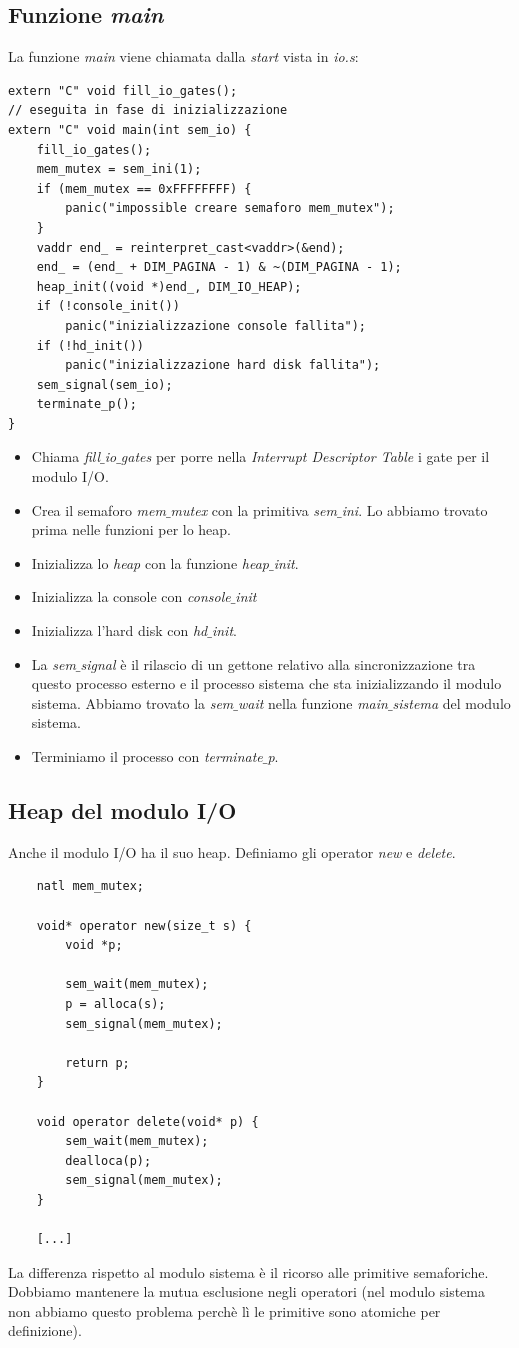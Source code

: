 \documentclass[11pt]{report}
\theoremstyle{definition}
\begin{document}
\subsection{Funzione \emph{main}}
La funzione \emph{main} viene chiamata dalla \emph{start} vista in \emph{io.s}:
\small
\begin{verbatim}
extern "C" void fill_io_gates();
// eseguita in fase di inizializzazione
extern "C" void main(int sem_io) {	
    fill_io_gates();
    mem_mutex = sem_ini(1);
    if (mem_mutex == 0xFFFFFFFF) {
        panic("impossible creare semaforo mem_mutex");
    }
    vaddr end_ = reinterpret_cast<vaddr>(&end);
    end_ = (end_ + DIM_PAGINA - 1) & ~(DIM_PAGINA - 1);
    heap_init((void *)end_, DIM_IO_HEAP);
    if (!console_init())
        panic("inizializzazione console fallita");
    if (!hd_init())
        panic("inizializzazione hard disk fallita");
    sem_signal(sem_io);
    terminate_p();
}
\end{verbatim}
\normalsize 
\begin{itemize}
	\item Chiama \emph{fill$\_$io$\_$gates} per porre nella \emph{Interrupt Descriptor Table} i gate per il modulo I/O.
	\item Crea il semaforo \emph{mem$\_$mutex} con la primitiva \emph{sem$\_$ini}. Lo abbiamo trovato prima nelle funzioni per lo heap.
	\item Inizializza lo \emph{heap} con la funzione \emph{heap$\_$init}.
	\item Inizializza la console con \emph{console$\_$init}
	\item Inizializza l'hard disk con \emph{hd$\_$init}.
	\item La \emph{sem$\_$signal} è il rilascio di un gettone relativo alla sincronizzazione tra questo processo esterno e il processo sistema che sta inizializzando il modulo sistema. Abbiamo trovato la \emph{sem$\_$wait} nella funzione \emph{main$\_$sistema} del modulo sistema.
	\item Terminiamo il processo con \emph{terminate$\_$p}.
\end{itemize}


\subsection{Heap del modulo I/O}
Anche il modulo I/O ha il suo heap. Definiamo gli operator \emph{new} e \emph{delete}.
\small 
\begin{verbatim}
	natl mem_mutex;
	
	void* operator new(size_t s) {
		void *p;
		
		sem_wait(mem_mutex);
		p = alloca(s);
		sem_signal(mem_mutex);
		
		return p;
	}
	
	void operator delete(void* p) {
		sem_wait(mem_mutex);
		dealloca(p);
		sem_signal(mem_mutex);
	}
	
	[...]
\end{verbatim}
\normalsize 
La differenza rispetto al modulo sistema è il ricorso alle primitive semaforiche. Dobbiamo mantenere la mutua esclusione negli operatori (nel modulo sistema non abbiamo questo problema perchè lì le primitive sono atomiche per definizione).  
\end{document}
